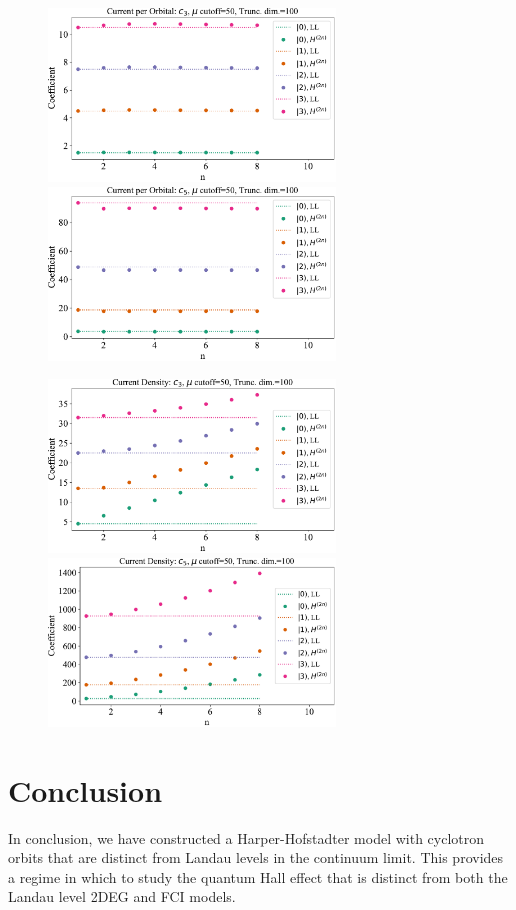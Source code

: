 \documentclass[aps,prb,twocolumn,letterpaper,twoside,nobalancelastpage,groupedaddress,amsmath,amssymb,floatfix,citeautoscript]{revtex4-1}
\begin{document}
\begin{figure}[tb]
\includegraphics[width=3.0in]{current-orbital-c3.pdf}
\includegraphics[width=3.0in]{current-orbital-c5.pdf}
\caption{\label{plot-current-per-orbital}}
\end{figure}

\begin{figure}[tb]
\includegraphics[width=3.0in]{current-density-c3-tight.pdf}
\includegraphics[width=3.0in]{current-density-c5-tight.pdf}
\caption{\label{plot-current-density}}
\end{figure}

\section{Conclusion}
In conclusion, we have constructed a Harper-Hofstadter model with cyclotron orbits that are distinct from Landau levels in the continuum limit. This provides a regime in which to study the quantum Hall effect that is distinct from both the Landau level 2DEG and FCI models. 
\end{document}
